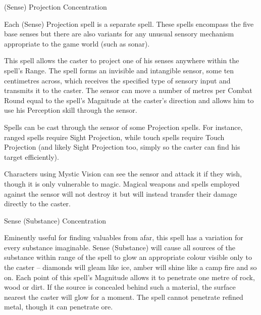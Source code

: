 \begin{samepage}
\begin{rpg-spell}
{(Sense) Projection}
{Concentration}

Each (Sense) Projection spell is a separate spell. These spells encompass the five base senses but there are also variants for any unusual sensory mechanism appropriate to the game world (such as sonar). 

This spell allows the caster to project one of his senses anywhere within the spell’s Range. The spell forms an invisible and intangible sensor, some ten centimetres across, which receives the specified type of sensory input and transmits it to the caster. The sensor can move a number of metres per Combat Round equal to the spell’s Magnitude at the caster’s direction and allows him to use his Perception skill through the sensor. 

Spells can be cast through the sensor of some Projection spells. For instance, ranged spells require Sight Projection, while touch spells require Touch Projection (and likely Sight Projection too, simply so the caster can find his target efficiently). 

Characters using Mystic Vision can see the sensor and attack it if they wish, though it is only vulnerable to magic. Magical weapons and spells employed against the sensor will not destroy it but will instead transfer their damage directly to the caster.
\end{rpg-spell}
\end{samepage}


\begin{samepage}
\begin{rpg-spell}
{Sense (Substance)}
{Concentration}

Eminently useful for finding valuables from afar, this spell has a variation for every substance imaginable. Sense (Substance) will cause all sources of the substance within range of the spell to glow an appropriate colour visible only to the caster – diamonds will gleam like ice, amber will shine like a camp fire and so on. Each point of this spell’s Magnitude allows it to penetrate one metre of rock, wood or dirt. If the source is concealed behind such a material, the surface nearest the caster will glow for a moment. The spell cannot penetrate refined metal, though it can penetrate ore. 
\end{rpg-spell}
\end{samepage}


